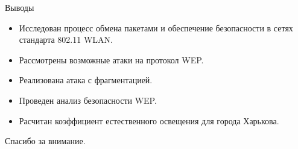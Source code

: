 \documentclass[12pt]{beamer}
\begin{document}
\begin{frame}{Выводы}

    \begin{itemize}
        \item Исследован процесс обмена пакетами и обеспечение безопасности в сетях стандарта 802.11 WLAN.
        \item Рассмотрены возможные атаки на протокол WEP.
        \item Реализована атака с фрагментацией.
        \item Проведен анализ безопасности WEP.
        \item Расчитан коэффициент естественного освещения для города Харькова.
    \end{itemize}

\end{frame} 


\begin{frame}{}

    \begin{center}
        \LARGE{Спасибо за внимание.}
    \end{center}

\end{frame}
\end{document}
